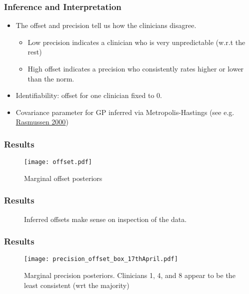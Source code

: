 \begin{frame}
	\frametitle{Inference and Interpretation}
	\begin{itemize}
		\item The offset and precision tell us how the clinicians disagree.
		\begin{itemize}
			\item Low precision indicates a clinician who is very unpredictable (w.r.t the rest)
			\item High offset indicates a precision who consistently rates higher or lower than the norm.
		\end{itemize}
		\item<2->Identifiability: offset for one clinician fixed to 0.
		\item<2->Covariance parameter for GP inferred via Metropolis-Hastings (see e.g. \href{http://citeseerx.ist.psu.edu/viewdoc/summary?doi=10.1.1.45.9111}{Rasmussen 2000})
	\end{itemize}
\end{frame}

\begin{frame}
	\frametitle{Results}
	\begin{figure}[tbh]
		\centering\texttt{[image: offset.pdf]}
		\centering\caption{\label{fig:offset}Marginal offset posteriors}
	\end{figure}
\end{frame}

\begin{frame}
	\frametitle{Results}
	\begin{figure}[tbh]
		\centering\caption{\label{fig:actualratings}Inferred offsets make sense on inspection of the data.}
	\end{figure}
\end{frame}

\begin{frame}
	\frametitle{Results}
	\begin{figure}[tbh]
		\centering\texttt{[image: precision\_offset\_box\_17thApril.pdf]}
		\centering\caption{\label{fig:clinicalprecision}Marginal precision posteriors. Clinicians 1, 4, and 8 appear to be the least consistent (wrt the majority)}
	\end{figure}
\end{frame}

